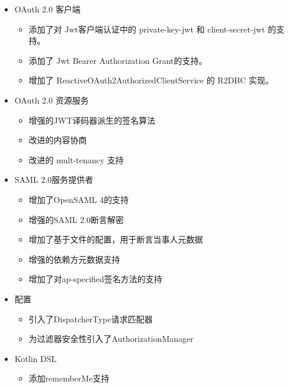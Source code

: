 \begin{itemize}
  \item OAuth 2.0 客户端
        \begin{itemize}
          \item 添加了对 Jwt客户端认证中的 private-key-jwt 和 client-secret-jwt 的支持。
          \item 添加了 Jwt Bearer Authorization Grant的支持。
          \item 增加了 ReactiveOAuth2AuthorizedClientService 的 R2DBC 实现。
        \end{itemize}
  \item OAuth 2.0 资源服务
        \begin{itemize}
          \item 增强的JWT译码器派生的签名算法
          \item 改进的内容协商
          \item 改进的 mult-tenancy 支持
        \end{itemize}
  \item SAML 2.0服务提供者
        \begin{itemize}
          \item 增加了OpenSAML 4的支持
          \item 增强的SAML 2.0断言解密
          \item 增加了基于文件的配置，用于断言当事人元数据
          \item 增强的依赖方元数据支持
          \item 增加了对ap-specified签名方法的支持
        \end{itemize}
  \item 配置
        \begin{itemize}
          \item 引入了DispatcherType请求匹配器
          \item 为过滤器安全性引入了AuthorizationManager
        \end{itemize}
  \item Kotlin DSL
        \begin{itemize}
          \item 添加rememberMe支持
        \end{itemize}
\end{itemize}

